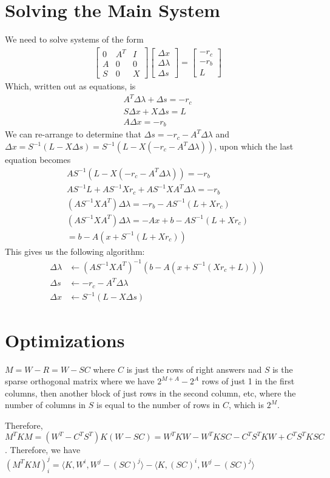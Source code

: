 \documentclass{article}
\begin{document}
\section{Solving the Main System}

We need to solve systems of the form
\begin{align}
		\begin{bmatrix}
				0 & A^T & I\\
				A & 0   & 0\\
				S & 0   & X
		\end{bmatrix}
		\begin{bmatrix}
				\Delta x\\
				\Delta \lambda\\
				\Delta s
		\end{bmatrix} 
		= 
		\begin{bmatrix}
				-r_c\\
				-r_b\\
				L
		\end{bmatrix}
\end{align}
Which, written out as equations, is
\begin{align}
		A^T\Delta \lambda + \Delta s = -r_c\\
		S\Delta x + X\Delta s = L\\
		A\Delta x = -r_b
\end{align}
We can re-arrange to determine that $\Delta s = -r_c - A^T\Delta \lambda$ and $\Delta x = S^{-1}(L - X\Delta s) = S^{-1}(L - X(-r_c - A^T\Delta \lambda))$, upon which the last equation becomes
\begin{align}
		AS^{-1}(L - X(-r_c - A^T\Delta \lambda)) = -r_b\\
		AS^{-1}L + AS^{-1}Xr_c + AS^{-1}XA^T\Delta \lambda = -r_b\\
		(AS^{-1}XA^T) \Delta \lambda = -r_b - AS^{-1}(L + Xr_c)\\
		(AS^{-1}XA^T) \Delta \lambda = -Ax + b - AS^{-1}(L + Xr_c)\\
		= b - A(x + S^{-1}(L + Xr_c))
\end{align}
This gives us the following algorithm:
\begin{align}
	\Delta \lambda &\leftarrow (AS^{-1}XA^T)^{-1}(b-A(x + S^{-1}(Xr_c + L)))\\
	\Delta s &\leftarrow -r_c - A^T\Delta \lambda\\
	\Delta x &\leftarrow S^{-1}(L - X\Delta s)
\end{align}

\section{Optimizations}

$M = W - R = W - SC$ where $C$ is just the rows of right answers nad $S$ is the sparse orthogonal matrix where we have $2^{M+A} - 2^A$ rows of just 1 in the first columns, then another block of just rows in the second column, etc, where the number of columns in $S$ is equal to the number of rows in $C$, which is $2^M$.

Therefore, $M^TKM = (W^T - C^TS^T)K(W-SC) = W^TKW - W^TKSC - C^TS^TKW + C^TS^TKSC$. Therefore, we have $(M^TKM)_i^j = \langle K, W^i, W^j - (SC)^j \rangle - \langle K, (SC)^i, W^j - (SC)^j \rangle$ 
\end{document}
